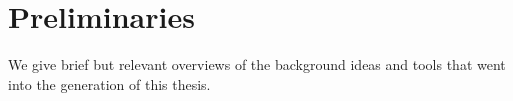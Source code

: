\section{Preliminaries}

We give brief but relevant overviews of the background ideas and tools that went
into the generation of this thesis. 





% 


